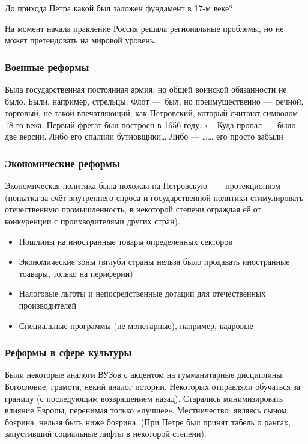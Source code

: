 \documentclass[12pt, a4paper]{article}
\begin{document}
До прихода Петра какой был заложен фундамент в 17-м веке?

На момент начала пракление Россия решала региональные проблемы, но не может претендовать на мировой уровень.


\subsubsection{Военные реформы} 

Была государственная постоянная армия, но общей воинской обязанности не было. Были, например, стрельцы.
Флот — был, но преимущественно — речной, торговый, не такой впечатляющий, как Петровский, который считают символом 18-го века. 
Первый фрегат был построен в 1656 году. ← Куда пропал — было две версии. Либо его спалили бутновщики… Либо — …… его просто забыли


\subsubsection{Экономические реформы}

Экономическая политика была похожая на Петровскую — 
протекционизм (попытка за счёт внутреннего спроса и государственной политики стимулировать отечественную промышленность, 
в некоторой степени ограждая её от конкуренции с проихводителями других стран).

\begin{itemize}
    \item Пошлины на иностранные товары определённых секторов
    \item Экономические зоны (вглуби страны нельзя было продавать иностранные тоавары, только на периферии)
    \item Налоговые льготы и непосредственные дотации для отечественных производителей
    \item Специальные программы (не монетарные), например, кадровые
\end{itemize}


\subsubsection{Реформы в сфере культуры}

Были некоторые аналоги ВУЗов с акцентом на гумманитарные дисциплины.
Богословие, грамота, некий аналог истории. Некоторых отправляли обучаться за границу (с последующим возвращением назад).
Старались минимизировать влияние Европы, перенимая только «лучшее». Местничество: являясь сыном боярина, нельзя быть ниже боярина. 
(При Петре был принят табель о рангах, запустивший социальные лифты в некоторой степени).
\end{document}
